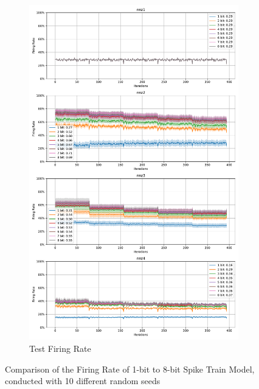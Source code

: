     \begin{figure}[!htpb]
        \ContinuedFloat
        \begin{subfigure}[H]{0.9\textwidth}
            \centering
            \includegraphics[width=\textwidth]{../standard/FashionMNIST/plots/fashionmnist_test_firerate.pdf}
            \caption{Test Firing Rate}
        \end{subfigure}
        \caption{Comparison of the Firing Rate of 1-bit to 8-bit Spike Train Model, conducted with 10 different random seeds}
        \label{fig:firing_rate}
    \end{figure}

